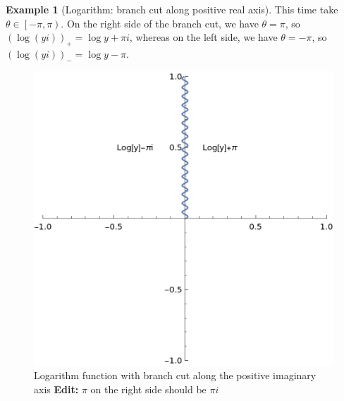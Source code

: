 \documentclass[a4paper, 12pt]{article}
\theoremstyle{definition}
\newtheorem{example}{Example}
\numberwithin{theorem}{section}
\numberwithin{definition}{section}
\numberwithin{exercise}{section}
\numberwithin{remark}{section}
\numberwithin{figure}{section}
\numberwithin{example}{section}
\begin{document}
\begin{example}[Logarithm: branch cut along positive real axis]
    This time take $\theta \in \left[ -\pi, \pi \right)$.
    On the right side of the branch cut, we have $\theta = \pi$, so
    $\left( \log \left( yi \right) \right)_{+} = \log{y} + \pi i$,
    whereas on the left side, we have $\theta = -\pi$, so
    $\left( \log \left( yi \right) \right)_{-} = \log{y} - \pi$.

    \begin{figure}[tbp]
        \centering
        \includegraphics{logpositiveimaginary}
        \caption{Logarithm function with branch cut along the positive imaginary axis \textbf{Edit:} $\pi$ on the right side should be $\pi i$}
        \label{fig: Log Positive Imaginary}
    \end{figure}
\end{example}
\end{document}
